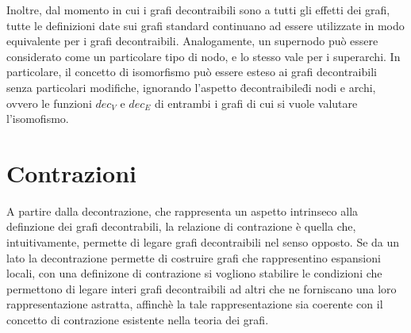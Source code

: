     Inoltre, dal momento in cui i grafi decontraibili sono a tutti gli effetti dei grafi, tutte le
    definizioni date sui grafi standard continuano ad essere utilizzate in modo equivalente per i grafi decontraibili.
    Analogamente, un supernodo pu\`o essere considerato come un particolare tipo di nodo, e lo stesso vale per i
    superarchi.
    In particolare, il concetto di isomorfismo pu\`o essere esteso ai grafi decontraibili senza particolari modifiche,
    ignorando l'aspetto \"decontraibile\" di nodi e archi, ovvero le funzioni $dec_V$ e $dec_E$ di entrambi i grafi
    di cui si vuole valutare l'isomofismo.




    \section{Contrazioni}\label{subsec:contrazioni}
    A partire dalla decontrazione, che rappresenta un aspetto intrinseco alla definzione dei grafi decontrabili,
    la relazione di contrazione \`e quella che, intuitivamente, permette di legare grafi decontraibili nel senso
    opposto.
    Se da un lato la decontrazione permette di costruire grafi che rappresentino espansioni locali, con una
    definizone di contrazione si vogliono stabilire le condizioni che permettono di legare interi grafi decontraibili
    ad altri che ne forniscano una loro rappresentazione astratta, affinch\`e la tale rappresentazione
    sia coerente con il concetto di contrazione esistente nella teoria dei grafi.

